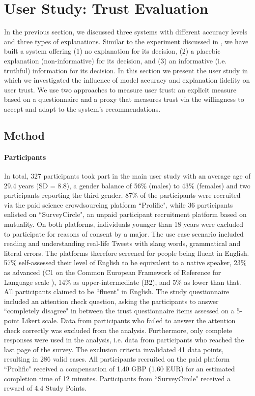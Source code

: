 \section{User Study: Trust Evaluation}
In the previous section, we discussed three systems with different accuracy levels and three types of explanations. Similar to the experiment discussed in \cite{langer1978mindlessness}, we have built a system offering (1) no explanation for its decision, (2) a placebic explanation (non-informative) for its decision, and (3) an informative (i.e. truthful) information for its decision. In this section we present the user study in which we investigated the influence of model accuracy and explanation fidelity on user trust. We use two approaches to measure user trust: an explicit measure based on a questionnaire and a proxy that measures trust via the willingness to accept and adapt to the system's recommendations.


\subsection{Method}

\paragraph{Participants}
In total, 327 participants took part in the main user study with an average age of 29.4 years (SD = 8.8), a gender balance of 56\% (males) to 43\% (females) and two participants reporting the third gender. 87\% of the participants were recruited via the paid science crowdsourcing platform ``Prolific", while 36 participants enlisted on ``SurveyCircle", an unpaid participant recruitment platform based on mutuality.\newline
On both platforms, individuals younger than 18 years were excluded to participate for reasons of consent by a major. The use case scenario included reading and understanding real-life Tweets with slang words, grammatical and literal errors. The platforms therefore screened for people being fluent in English. 57\% self-assessed their level of English to be equivalent to a native speaker, 23\% as advanced (C1 on the Common European Framework of Reference for Language scale \cite{council2001common}), 14\% as upper-intermediate (B2), and 5\% as lower than that. All participants claimed to be ``fluent" in English. The study questionnaire included an attention check question, asking the participants to answer ``completely disagree" in between the trust questionnaire items assessed on a 5-point Likert scale. Data from participants who failed to answer the attention check correctly was excluded from the analysis. Furthermore, only complete responses were used in the analysis, i.e. data from participants who reached the last page of the survey. The exclusion criteria invalidated 41 data points, resulting in 286 valid cases.\newline
All participants recruited on the paid platform ``Prolific" received a compensation of 1.40 GBP (1.60 EUR) for an estimated completion time of 12 minutes. Participants from ``SurveyCircle" received a reward of 4.4 Study Points.


